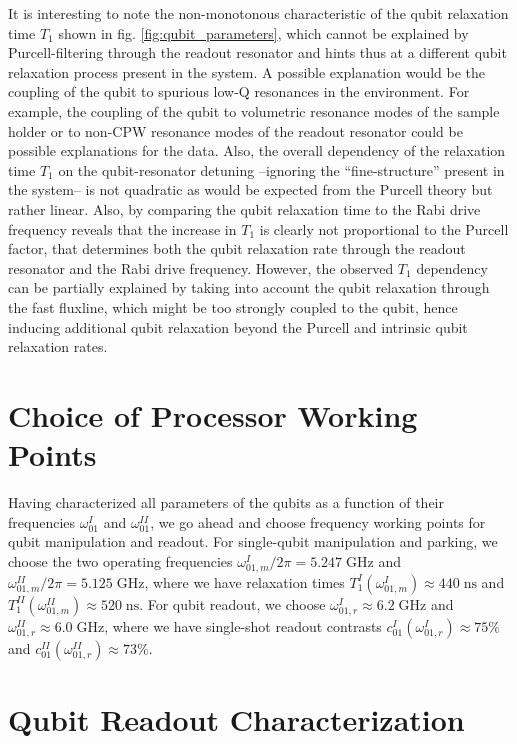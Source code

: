 \smallskip

It is interesting to note the non-monotonous characteristic of the qubit relaxation time $T_1$ shown in fig. \ref{fig:qubit_parameters}, which cannot be explained by Purcell-filtering through the readout resonator and hints thus at a different qubit relaxation process present in the system. A possible explanation would be the coupling of the qubit to spurious low-Q resonances in the environment. For example, the coupling of the qubit to volumetric resonance modes of the sample holder or to non-CPW resonance modes of the readout resonator could be possible explanations for the data. Also, the overall dependency of the relaxation time $T_1$ on the qubit-resonator detuning --ignoring the ``fine-structure'' present in the system-- is not quadratic as would be expected from the Purcell theory but rather linear. Also, by comparing the qubit relaxation time to the Rabi drive frequency reveals that the increase in $T_1$ is clearly not proportional to the Purcell factor, that determines both the qubit relaxation rate through the readout resonator and the Rabi drive frequency. However, the observed $T_1$ dependency can be partially explained by taking into account the qubit relaxation through the fast fluxline, which might be too strongly coupled to the qubit, hence inducing additional qubit relaxation beyond the Purcell and intrinsic qubit relaxation rates.

\section{Choice of Processor Working Points}

Having characterized all parameters of the qubits as a function of their frequencies $\omega_{01}^I$ and $\omega_{01}^{II}$, we go ahead and choose frequency working points for qubit manipulation and readout. For single-qubit manipulation and parking, we choose the two operating frequencies $\omega_{01,m}^I/2\pi = 5.247\;\mathrm{GHz}$ and $\omega_{01,m}^{II}/2\pi = 5.125\;\mathrm{GHz}$, where we have relaxation times $T_1^I(\omega_{01,m}^I) \approx 440\;\mathrm{ns}$ and $T_1^{II}(\omega_{01,m}^{II})\approx 520\;\mathrm{ns}$. For qubit readout, we choose $\omega_{01,r}^I \approx 6.2\;\mathrm{GHz}$ and $\omega_{01,r}^{II}\approx 6.0\;\mathrm{GHz}$, where we have single-shot readout contrasts $c_{01}^I(\omega_{01,r}^I)\approx 75\%$ and $c_{01}^{II}(\omega_{01,r}^{II})\approx 73\%$.

\section{Qubit Readout Characterization} \label{section:readout_matrix}

